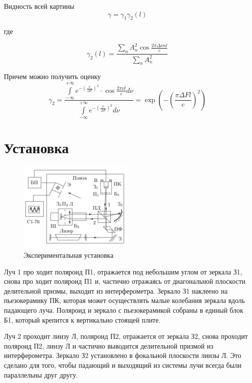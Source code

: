 \documentclass[a4paper, 12pt]{article}%
\begin{document}
\newpage
Видность всей картины 
\begin{equation}
\gamma = \gamma_1 \gamma_2(l)
\end{equation}

где

\begin{equation}
\gamma_2(l) = \dfrac{\sum\limits_n A_n^2 \cos \frac{2\pi\Delta \nu n l}{c}}{\sum\limits_n A_n^2}
\end{equation}

Причем можно получить оценку
\begin{equation}
\gamma_2 = \dfrac{\int\limits_{-\infty}^{+\infty}e^{-\left(\frac{\nu}{\Delta F}\right)^2} \cdot \cos \frac{2\pi\nu l}{c} d\nu}{\int\limits_{-\infty}^{+\infty}e^{-\left(\frac{\nu}{\Delta F}\right)^2} d\nu} = \exp\left(- \left(\frac{\pi \Delta F l}{c}\right)^2\right)
\end{equation}

\section*{Установка}
\begin{figure}
  \begin{center}
    \includegraphics[width = 0.5\textwidth]{3.png}
  \end{center}
  \caption{Экспериментальная установка}
\end{figure}
Луч 1 про ходит поляроид П1, отражается под небольшим углом от зеркала З1, снова про ходит поляроид П1 и, частично отражаясь от диагональной плоскости делительной призмы, выходит из интерферометра. Зеркало З1 наклеено на пьезокерамику ПК, которая может осуществлять малые колебания зеркала вдоль падающего луча. Поляроид и зеркало с пьезокерамикой собраны в единый блок Б1, который крепится к вертикально стоящей плите.

Луч 2 проходит линзу Л, поляроид П2, отражается от зеркала З2, снова проходит поляроид П2, линзу Л и частично выводится делительной призмой из интерферометра. Зеркало З2 установлено в фокальной плоскости линзы Л. Это сделано для того, чтобы падающий и выходящий из системы лучи всегда были параллельны друг другу.
\end{document}

